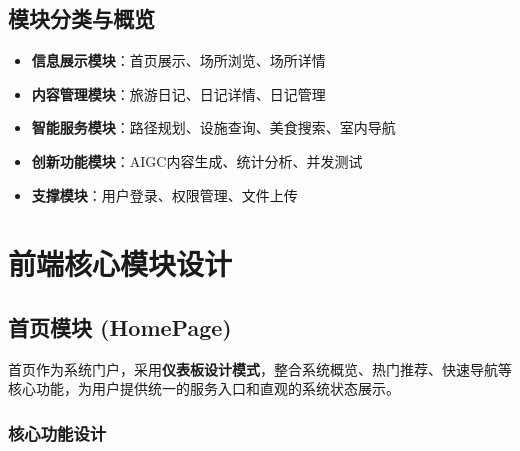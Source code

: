 \documentclass[12pt,a4paper]{article}
\begin{document}
\subsection{模块分类与概览}

\begin{successbox}[title={14个核心功能模块}]
\begin{itemize}[nosep]
    \item \textbf{信息展示模块}：首页展示、场所浏览、场所详情
    \item \textbf{内容管理模块}：旅游日记、日记详情、日记管理
    \item \textbf{智能服务模块}：路径规划、设施查询、美食搜索、室内导航
    \item \textbf{创新功能模块}：AIGC内容生成、统计分析、并发测试
    \item \textbf{支撑模块}：用户登录、权限管理、文件上传
\end{itemize}
\end{successbox}

\section{前端核心模块设计}

\subsection{首页模块 (HomePage)}

\begin{designbox}[title={设计理念与功能定位}]
首页作为系统门户，采用\textbf{仪表板设计模式}，整合系统概览、热门推荐、快速导航等核心功能，为用户提供统一的服务入口和直观的系统状态展示。
\end{designbox}

\subsubsection{核心功能设计}
\end{document}
